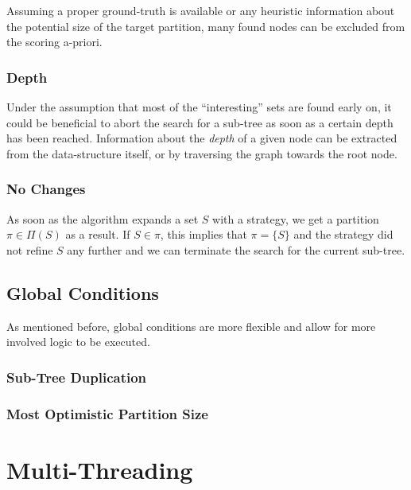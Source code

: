 				Assuming a proper ground-truth is available or any heuristic information about the potential size of the target partition, many found nodes can be excluded from the scoring a-priori. 
			
			\subsubsection{Depth}
			
				Under the assumption that most of the \enquote{interesting} sets are found early on, it could be beneficial to abort the search for a sub-tree as soon as a certain depth has been reached.
				Information about the \textit{depth} of a given node can be extracted from the data-structure itself, or by traversing the graph towards the root node.
				
			\subsubsection{No Changes}
			
				As soon as the algorithm expands a set $S$ with a strategy, we get a partition $\pi \in \Pi(S)$ as a result.
				If $S \in \pi$, this implies that $\pi = \{ S \}$ and the strategy did not refine $S$ any further and we can terminate the search for the current sub-tree.
		
		\subsection{Global Conditions}
		
			As mentioned before, global conditions are more flexible and allow for more involved logic to be executed.
			
			\subsubsection{Sub-Tree Duplication}
			
			\subsubsection{Most Optimistic Partition Size}
	
			\clearpage
	
	\section{Multi-Threading}
	\label{chap:impl:multi}

